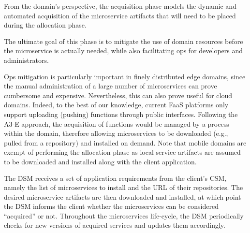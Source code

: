 
From the domain's perspective, the acquisition phase models the dynamic and automated acquisition of the microservice artifacts that will need to be placed during the allocation phase. %



The ultimate goal of this phase is to mitigate the use of domain resources before the microservice is actually needed, while also facilitating ops for developers and administrators. 

Ops mitigation is particularly important in finely distributed edge domains, since the manual administration of a large number of microservices can prove cumbersome and expensive. Nevertheless, this can also prove useful for cloud domains. Indeed, to the best of our knowledge, current FaaS platforms only support uploading (pushing) functions through public interfaces. Following the A3-E approach, the acquisition of functions would be managed by a process within the domain, therefore allowing microservices to be downloaded (e.g., pulled from a repository) and installed on demand. Note that mobile domains are exempt of performing the allocation phase as local service artifacts are assumed to be downloaded and installed along with the client application.


The DSM receives a set of application requirements from the client's CSM, namely the list of microservices to install and the URL of their repositories. The desired microservice artifacts are then downloaded and installed, at which point the DSM informs the client whether the microservices can be considered ``acquired'' or not.
Throughout the microservices life-cycle, the DSM periodically checks for new versions of acquired services and updates them accordingly. 


